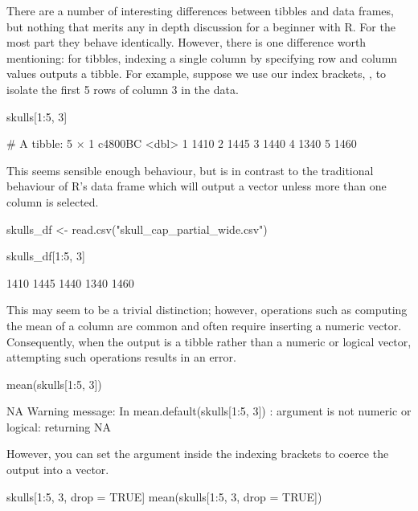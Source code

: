\noindent
There are a number of interesting differences between tibbles and data frames, but nothing that merits any in depth discussion for a beginner with R. For the most part they behave identically. However, there is one difference worth mentioning: for tibbles, indexing a single column by specifying row and column values outputs a tibble. For example, suppose we use our index brackets, \R{[ ]}, to isolate the first 5 rows of column 3 in the  data.

\begin{inR}
skulls[1:5, 3]
\end{inR}

\begin{outR}
# A tibble: 5 × 1
  c4800BC
    <dbl>
1    1410
2    1445
3    1440
4    1340
5    1460
\end{outR}

\noindent This seems sensible enough behaviour, but is in contrast to the traditional behaviour of R's data frame which will output a vector unless more than one column is selected.

\begin{inR}
skulls_df <- read.csv("skull_cap_partial_wide.csv")

skulls_df[1:5, 3]
\end{inR}

\begin{outR}
[1] 1410 1445 1440 1340 1460
\end{outR}

This may seem to be a trivial distinction; however, operations such as computing the mean of a column are common and often require inserting a numeric vector. Consequently, when the output is a tibble rather than a numeric or logical vector, attempting such operations results in an error.

\begin{inR}
mean(skulls[1:5, 3])
\end{inR}

\begin{outR}
[1] NA
Warning message:
In mean.default(skulls[1:5, 3]) :
  argument is not numeric or logical: returning NA
\end{outR}

\noindent However, you can set the argument  inside the indexing brackets to coerce the output into a vector.

\begin{inR}
skulls[1:5, 3, drop = TRUE]
mean(skulls[1:5, 3, drop = TRUE])
\end{inR}

